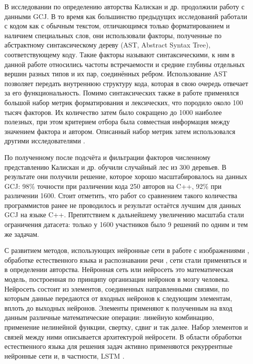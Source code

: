В исследовании по определению авторства Калискан и др. \cite{Caliskan2015} продолжили работу с данными GCJ. В то время как большинство предыдущих исследований работали с кодом как с обычным текстом, отличающимся только форматированием и наличием специальных слов, они использовали факторы, полученные по абстрактному синтаксическому дереву (AST, Abstract Syntax Tree), соответствующему коду. Такие факторы называют синтаксическими, к ним в данной работе относились частоты встречаемости и средние глубины отдельных вершин разных типов и их пар, соединённых ребром. Использование AST позволяет передать внутреннюю структуру кода, которая в свою очередь отвечает за его функциональность. Помимо синтаксических также в работе применялся большой набор метрик форматирования и лексических, что породило около 100 тысяч факторов. Их количество затем было сокращено до 1000 наиболее полезных, при этом критерием отбора была совместная информация между значением фактора и автором. Описанный набор метрик затем использовался другими исследователями \cite{Yang2017}.

По полученному после подсчёта и фильтрации факторов численному представлению Калискан и др. обучили случайный лес из 300 деревьев. В результате они получили решение, которое хорошо масштабировалось на данных GCJ: 98\% точности при различении кода 250 авторов на C++, 92\% при различении 1600. Стоит отметить, что работ со сравнением такого количества программистов ранее не проводилось и результат остаётся лучшим для данных GCJ  на языке C++. Препятствием к дальнейшему увеличению масштаба стали ограничения датасета: только у 1600 участников было 9 решений по одним и тем же задачам.

С развитием методов, использующих нейронные сети в работе с изображениями \cite{He2016}, обработке естественного языка \cite{Young2018} и распознавании речи \cite{Zhang2018-speech}, сети стали применяться и в определении авторства. Нейронная сеть или нейросеть это математическая модель, построенная по принципу организации нейронов в мозгу человека. Нейросеть состоит из элементов, соединенных направленными связями, по которым данные передаются от входных нейронов к следующим элементам, вплоть до выходных нейронов. Элементы применяют к полученным на вход данным различные математические операции: линейную комбинацию, применение нелинейной функции, свертку, сдвиг и так далее. Набор элементов и связей между ними описывается архитектурой нейросети. В области обработки естественного языка для решения задач активно применяются рекуррентные нейронные сети \cite{Jordan1990} и, в частности, LSTM \cite{Hochreiter1997}.

